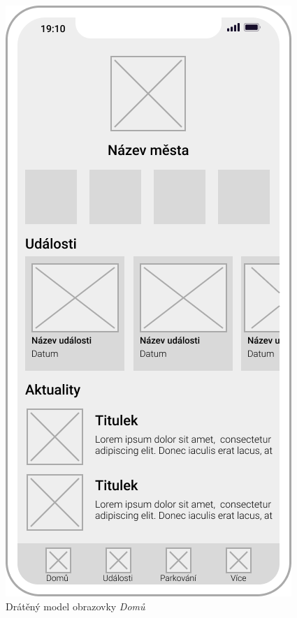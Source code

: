 \hfill
\begin{minipage}[t]{0.45\textwidth}
  \begin{figure}[H]
    \centering
    \includegraphics[width=.7\textwidth]{home_wireframe.png}
    \caption{Drátěný model obrazovky \textit{Domů}}
    \label{fig:wireframe1}
  \end{figure}
  \begin{figure}[H]
    \centering

\end{figure}
\end{minipage}
